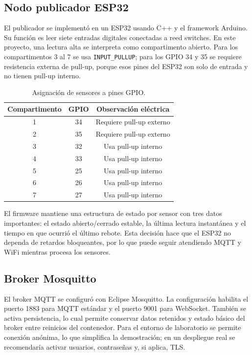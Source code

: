 \documentclass[12pt,letterpaper]{article}
\begin{document}
\subsection{Nodo publicador ESP32}

El publicador se implementó en un ESP32 usando C++ y el framework Arduino. Su función es leer siete entradas digitales conectadas a reed switches. En este proyecto, una lectura alta se interpreta como compartimento abierto. Para los compartimentos 3 al 7 se usa \texttt{INPUT\_PULLUP}; para los GPIO 34 y 35 se requiere resistencia externa de pull-up, porque esos pines del ESP32 son solo de entrada y no tienen pull-up interno.

\begin{table}[H]
\centering
\caption{Asignación de sensores a pines GPIO.}
\begin{tabular}{ccc}
\toprule
\textbf{Compartimento} & \textbf{GPIO} & \textbf{Observación eléctrica} \\
\midrule
1 & 34 & Requiere pull-up externo \\
2 & 35 & Requiere pull-up externo \\
3 & 32 & Usa pull-up interno \\
4 & 33 & Usa pull-up interno \\
5 & 25 & Usa pull-up interno \\
6 & 26 & Usa pull-up interno \\
7 & 27 & Usa pull-up interno \\
\bottomrule
\end{tabular}
\end{table}

El firmware mantiene una estructura de estado por sensor con tres datos importantes: el estado abierto/cerrado estable, la última lectura instantánea y el tiempo en que ocurrió el último rebote. Esta decisión hace que el ESP32 no dependa de retardos bloqueantes, por lo que puede seguir atendiendo MQTT y WiFi mientras procesa los sensores.

\subsection{Broker Mosquitto}

El broker MQTT se configuró con Eclipse Mosquitto. La configuración habilita el puerto 1883 para MQTT estándar y el puerto 9001 para WebSocket. También se activa persistencia, lo cual permite conservar datos retenidos y estado básico del broker entre reinicios del contenedor. Para el entorno de laboratorio se permite conexión anónima, lo que simplifica la demostración; en un despliegue real se recomendaría activar usuarios, contraseñas y, si aplica, TLS.
\end{document}
